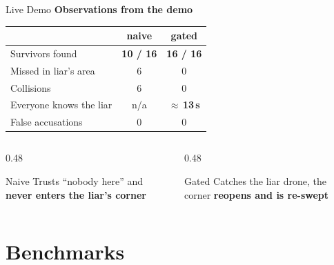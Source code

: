 \documentclass[aspectratio=169,10pt]{beamer}
\newcommand{\subhead}[1]{{\large\bfseries\color{accent}#1}\par\vspace{0.5em}}
\begin{document}
\begin{frame}{Live Demo}
\subhead{Observations from the demo}
\centering
\renewcommand{\arraystretch}{1.35}
\begin{tabular}{l c c}
\toprule
 & \textbf{naive} & \textbf{gated} \\
\midrule
Survivors found     & \textcolor{bad}{\textbf{10 / 16}} & \textcolor{good}{\textbf{16 / 16}} \\
Missed in liar's area & \textcolor{bad}{6} & \textcolor{good}{0} \\
Collisions          & \textcolor{bad}{6} & \textcolor{good}{0} \\
Everyone knows the liar & n/a & $\approx$\,\textbf{13\,s} \\
False accusations   & 0 & 0 \\
\bottomrule
\end{tabular}

\vspace{1em}
\raggedright
\begin{columns}[T]
\begin{column}{0.48\textwidth}
\begin{alertblock}{Naive}
Trusts ``nobody here'' and \textbf{never enters the liar's corner}
\end{alertblock}
\end{column}
\begin{column}{0.48\textwidth}
\begin{block}{Gated}
Catches the liar drone, the corner \textbf{reopens and is re-swept}
\end{block}
\end{column}
\end{columns}
\end{frame}

\section{Benchmarks}
\end{document}
